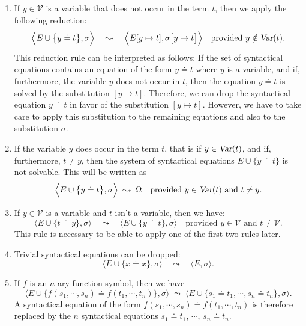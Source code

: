 \begin{enumerate}
\item If  $y\in\mathcal{V}$ is a variable that does not occur in the term $t$, then we
      apply the following reduction: 
      \[ \Big\langle E \cup \big\{ y \doteq t \big\}, \sigma \Big\rangle \quad\leadsto\quad 
         \Big\langle E[y \mapsto t], \sigma\big[ y \mapsto t \big] \Big\rangle 
         \quad \mbox{provided $y \notin \textsl{Var}(t)$.}
      \]
      This reduction rule can be interpreted as follows:  If the set of syntactical
      equations contains an equation of the form $y \doteq t$ where $y$ is a variable, and
      if, furthermore, the variable $y$ does not occur in $t$, then the equation $y \doteq t$
      is solved by the substitution $[y \mapsto t]$.  Therefore, we can drop the syntactical
      equation $y \doteq t$ in favor of the substitution $[y \mapsto t]$.  However, we have to take care
      to apply this substitution to the remaining equations and also to the substitution $\sigma$.
\item If the variable $y$ does occur in the term $t$, that is if  $y \in \textsl{Var}(t)$,
      and if, furthermore,  $t \not= y$, then the system of syntactical
      equations $E \cup \big\{ y \doteq t \big\}$ is not solvable.  This will be written as
      \[ \Big\langle E \cup \big\{ y \doteq t \big\}, \sigma \Big\rangle\;\leadsto\; \Omega
         \quad \mbox{provided $y \in \textsl{Var}(t)$ and $t \not= y$}. 
      \]
\item If $y\in\mathcal{V}$ is a variable and $t$ isn't a variable, then we have:
      \[ \Big\langle E \cup \big\{ t \doteq y \big\}, \sigma \Big\rangle \quad\leadsto\quad 
         \Big\langle E \cup \big\{ y \doteq t \big\}, \sigma \Big\rangle
              \quad \mbox{provided $y \in \mathcal{V}$ and $t \not= \mathcal{V}$}.
      \]   
      This rule is necessary to be able to apply one of the first two rules later.
\item Trivial syntactical equations can be dropped:
      \[ \Big\langle E \cup \big\{ x \doteq x \big\}, \sigma \Big\rangle \quad\leadsto\quad
         \Big\langle E, \sigma \Big\rangle.
      \]   
\item If $f$ is an $n$-ary function symbol, then we have 
      \[ \Big\langle E \cup \big\{ f(s_1,\cdots,s_n) \doteq f(t_1,\cdots,t_n) \big\}, \sigma \Big\rangle 
         \;\leadsto\; 
         \Big\langle E \cup \big\{ s_1 \doteq t_1, \cdots, s_n \doteq t_n\}, \sigma \Big\rangle.
      \]   
      A syntactical equation of the form $f(s_1,\cdots,s_n) \doteq f(t_1,\cdots,t_n)$ is therefore
      replaced by the $n$ syntactical equations  $s_1 \doteq t_1$, $\cdots$, $s_n \doteq t_n$.


\end{enumerate}
